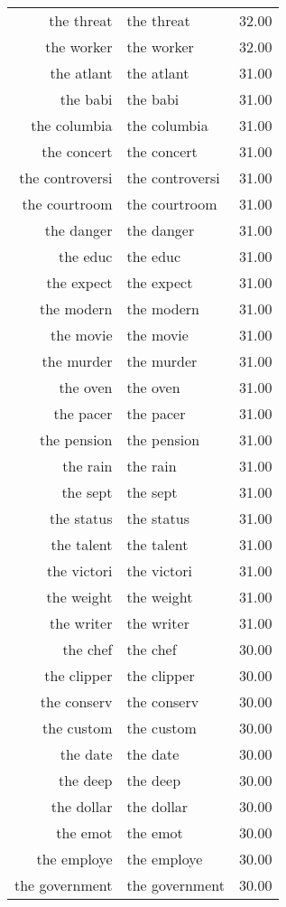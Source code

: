 \begin{table}[ht]
\begin{tabular}{rlr}
  the threat & the threat & 32.00 \\ 
  the worker & the worker & 32.00 \\ 
  the atlant & the atlant & 31.00 \\ 
  the babi & the babi & 31.00 \\ 
  the columbia & the columbia & 31.00 \\ 
  the concert & the concert & 31.00 \\ 
  the controversi & the controversi & 31.00 \\ 
  the courtroom & the courtroom & 31.00 \\ 
  the danger & the danger & 31.00 \\ 
  the educ & the educ & 31.00 \\ 
  the expect & the expect & 31.00 \\ 
  the modern & the modern & 31.00 \\ 
  the movie & the movie & 31.00 \\ 
  the murder & the murder & 31.00 \\ 
  the oven & the oven & 31.00 \\ 
  the pacer & the pacer & 31.00 \\ 
  the pension & the pension & 31.00 \\ 
  the rain & the rain & 31.00 \\ 
  the sept & the sept & 31.00 \\ 
  the status & the status & 31.00 \\ 
  the talent & the talent & 31.00 \\ 
  the victori & the victori & 31.00 \\ 
  the weight & the weight & 31.00 \\ 
  the writer & the writer & 31.00 \\ 
  the chef & the chef & 30.00 \\ 
  the clipper & the clipper & 30.00 \\ 
  the conserv & the conserv & 30.00 \\ 
  the custom & the custom & 30.00 \\ 
  the date & the date & 30.00 \\ 
  the deep & the deep & 30.00 \\ 
  the dollar & the dollar & 30.00 \\ 
  the emot & the emot & 30.00 \\ 
  the employe & the employe & 30.00 \\ 
  the government & the government & 30.00 \\ 

\end{tabular}
\end{table}
